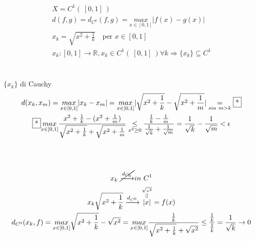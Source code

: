 \documentclass[a4paper, oneside]{article}
\begin{document}
    \begin{example}
    \begin{gather*}
        X = C^1 ( \ [0,1] \ )\\
        d(f,g) = d_{C^0}(f,g) = \underset{x \in [0,1]}{max} |f(x)- g(x)|\\
        x_k = \sqrt{x^2 + \frac{1}{k}} \quad \text{per } x \in [0,1]\\
        x_k: [0,1] \to \mathbb{R}, x_k \in C^1(\ [0,1] \ ) \forall k \Rightarrow \{x_k\} \subseteq C^1
    \end{gather*}     
    \hfil\\
    \\
    $\{x_k\}$ di Cauchy\\
    \begin{gather*}
        d(x_k,x_m) = \underset{x \in [0,1]}{max} |x_k-x_m| = \underset{x \in [0,1]}{max} |\sqrt{x^2+\frac{1}{k}}-\sqrt{x^2+\frac{1}{m}}| \underset{sia \ m>k}{=} \text{\fbox{*}}\\
        \text{\fbox{*}} \underset{x \in [0,1]}{max} \frac{x^2 +\frac{1}{k} -(x^2+\frac{1}{m})}{\sqrt{x^2+\frac{1}{k}}+\sqrt{x^2+\frac{1}{m}}} \underset{x^2 \geq 0}{\leq} \frac{\frac{1}{k}-\frac{1}{m}}{\frac{1}{\sqrt{k}}+\frac{1}{\sqrt{m}}} = \frac{1}{\sqrt{k}}- \frac{1}{\sqrt{m}} < \epsilon
    \end{gather*}

    \hfil\\
    \\
    \begin{gather*}
        x_k \ \cancel{\xrightarrow{d_{C_0}}} in \ C^1\\
        x_k \sqrt{x^2+\frac{1}{k}} \xrightarrow{d_{C^0}} \overset{\overset{\sqrt{x^2}}{||}}{|x|} = f(x)\\
        d_{C^0}(x_k,f) = \underset{x \in [0,1]}{max} \sqrt{x^2 +\frac{1}{k}}-\sqrt{x^2} = \underset{x \in [0,1]}{max} \frac{\frac{1}{k}}{\sqrt{x^2+\frac{1}{k}}+\sqrt{x^2}} \leq \frac{\frac{1}{k}}{\frac{1}{k}} = \frac{1}{\sqrt{k}} \to 0
    \end{gather*}

    \end{example}

    \newpage
\end{document}
